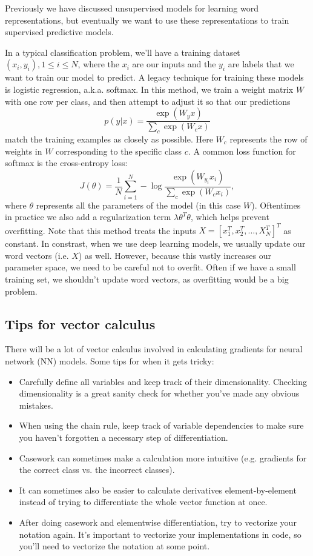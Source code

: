 Previously we have discussed unsupervised models for learning word representations, but eventually we want to use these representations to train supervised predictive models.

In a typical classification problem, we'll have a training dataset $(x_i, y_i), 1 \le i \le N$, where the $x_i$ are our inputs and the $y_i$ are labels that we want to train our model to predict. A legacy technique for training these models is logistic regression, a.k.a. softmax. In this method, we train a weight matrix $W$ with one row per class, and then attempt to adjust it so that our predictions
$$p(y|x) = \frac{\exp\left(W_y x\right)}{\sum_c \exp \left(W_c x\right)}$$
match the training examples as closely as possible. Here $W_c$ represents the row of weights in $W$ corresponding to the specific class $c$. A common loss function for softmax is the cross-entropy loss:
$$J(\theta) = \frac{1}{N} \sum_{i=1}^N -\log\frac{\exp \left( W_{y_i} x_i \right)}{\sum_c \exp\left(W_c x_i\right)},$$
where $\theta$ represents all the parameters of the model (in this case $W$). Oftentimes in practice we also add a regularization term $\lambda \theta^T \theta$, which helps prevent overfitting. Note that this method treats the inputs $X = [x_1^T, x_2^T, ..., X_N^T]^T$ as constant. In constrast, when we use deep learning models, we usually update our word vectors (i.e. $X$) as well. However, because this vastly increases our parameter space, we need to be careful not to overfit. Often if we have a small training set, we shouldn't update word vectors, as overfitting would be a big problem.

\subsection{Tips for vector calculus}
There will be a lot of vector calculus involved in calculating gradients for neural network (NN) models. Some tips for when it gets tricky:
\begin{itemize}
\item Carefully define all variables and keep track of their dimensionality. Checking dimensionality is a great sanity check for whether you've made any obvious mistakes.
\item When using the chain rule, keep track of variable dependencies to make sure you haven't forgotten a necessary step of differentiation.
\item Casework can sometimes make a calculation more intuitive (e.g. gradients for the correct class vs. the incorrect classes).
\item It can sometimes also be easier to calculate derivatives element-by-element instead of trying to differentiate the whole vector function at once.
\item After doing casework and elementwise differentiation, try to vectorize your notation again. It's important to vectorize your implementations in code, so you'll need to vectorize the notation at some point.
\end{itemize}

